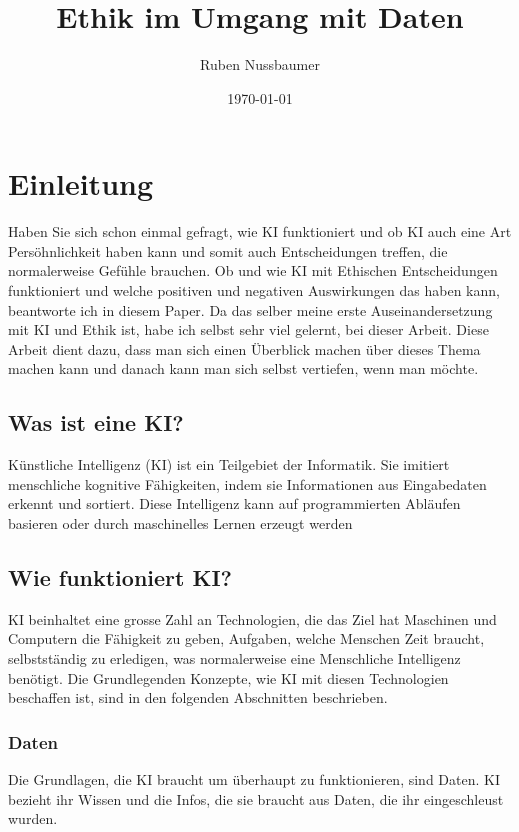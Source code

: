 \documentclass{report}
\title{Ethik im Umgang mit Daten}
\author{Ruben Nussbaumer}
\date{\today}
\begin{document}
\maketitle


\tableofcontents

\chapter{Einleitung}
Haben Sie sich schon einmal gefragt, wie KI funktioniert und ob KI auch eine Art Persöhnlichkeit haben kann und somit auch Entscheidungen treffen, die normalerweise Gefühle brauchen.
Ob und wie KI mit Ethischen Entscheidungen funktioniert und welche positiven und negativen Auswirkungen das haben kann, beantworte ich in diesem Paper.
Da das selber meine erste Auseinandersetzung mit KI und Ethik ist, habe ich selbst sehr viel gelernt, bei dieser Arbeit.
Diese Arbeit dient dazu, dass man sich einen Überblick machen über dieses Thema machen kann und danach kann man sich selbst vertiefen, wenn man möchte.
\section{Was ist eine KI?}
Künstliche Intelligenz (KI) ist ein Teilgebiet der Informatik. Sie imitiert menschliche kognitive Fähigkeiten, indem sie Informationen aus Eingabedaten erkennt und sortiert. Diese Intelligenz kann auf programmierten Abläufen basieren oder durch maschinelles Lernen erzeugt werden

\section{Wie funktioniert KI?}
KI beinhaltet eine grosse Zahl an Technologien, die das Ziel hat Maschinen und Computern die Fähigkeit
zu geben, Aufgaben, welche Menschen Zeit braucht, selbstständig zu erledigen, was normalerweise eine Menschliche Intelligenz benötigt.
Die Grundlegenden Konzepte, wie KI mit diesen Technologien beschaffen ist, sind in den folgenden Abschnitten beschrieben.
\subsection{Daten}
Die Grundlagen, die KI braucht um überhaupt zu funktionieren, sind Daten. KI bezieht ihr Wissen und die Infos, die sie braucht aus Daten, 
die ihr eingeschleust wurden.
\end{document}
